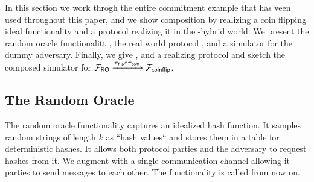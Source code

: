 In this section we work throgh the entire commitment example that has veen used throughout this paper, and we show composition by realizing a coin flipping ideal functionality \Fflip and a protocol realizing it in the \Fcom-hybrid world.
We present the random oracle functionalitt \Fro, the real world protocol , and a simulator for the dummy adversary.
Finally, we give \Fflip, and a realizing protocol and sketch the composed simulator for $\mathcal{F}_{{\mathsf {RO}}} \xrightarrow{\pi_{{\mathsf {flip}}} \circ \pi_{{\mathsf {com}}}} \mathcal{F}_{{\mathsf {coinflip}}}$.

%

\subsection{The Random Oracle}
The random oracle functionality captures an idealized hash function. It samples random strings of length $k$ as ``hash values`` and stores them in a table for deterministic hashes.
It allows both protocol parties and the adversary to request hashes from it.
We augment \Fro with a single communication channel allowing it parties to send messages to each other. The functionality is called \Fropp from now on.

